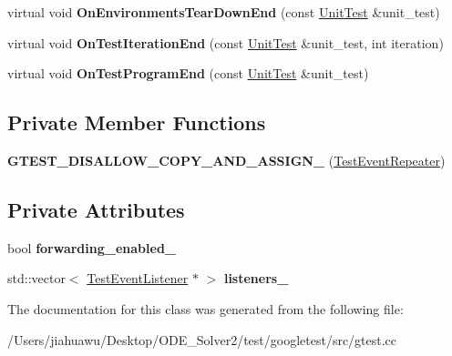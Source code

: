 \begin{DoxyCompactItemize}
\item 
\mbox{\label{classtesting_1_1internal_1_1_test_event_repeater_a8428220c4cf9f0cea2dfd9a70f07ab7f}} 
virtual void {\bfseries On\+Environments\+Tear\+Down\+End} (const \mbox{\hyperlink{classtesting_1_1_unit_test}{Unit\+Test}} \&unit\+\_\+test)
\item 
\mbox{\label{classtesting_1_1internal_1_1_test_event_repeater_a94253e3c11753328e8a031f39352708f}} 
virtual void {\bfseries On\+Test\+Iteration\+End} (const \mbox{\hyperlink{classtesting_1_1_unit_test}{Unit\+Test}} \&unit\+\_\+test, int iteration)
\item 
\mbox{\label{classtesting_1_1internal_1_1_test_event_repeater_a4622616259747dbcc23f5ee39ef99ec0}} 
virtual void {\bfseries On\+Test\+Program\+End} (const \mbox{\hyperlink{classtesting_1_1_unit_test}{Unit\+Test}} \&unit\+\_\+test)
\end{DoxyCompactItemize}
\subsection*{Private Member Functions}
\begin{DoxyCompactItemize}
\item 
\mbox{\label{classtesting_1_1internal_1_1_test_event_repeater_a882648737e85eff0986ff66b794e310a}} 
{\bfseries G\+T\+E\+S\+T\+\_\+\+D\+I\+S\+A\+L\+L\+O\+W\+\_\+\+C\+O\+P\+Y\+\_\+\+A\+N\+D\+\_\+\+A\+S\+S\+I\+G\+N\+\_\+} (\mbox{\hyperlink{classtesting_1_1internal_1_1_test_event_repeater}{Test\+Event\+Repeater}})
\end{DoxyCompactItemize}
\subsection*{Private Attributes}
\begin{DoxyCompactItemize}
\item 
\mbox{\label{classtesting_1_1internal_1_1_test_event_repeater_a1f7e494642d653eaad800504510d18a3}} 
bool {\bfseries forwarding\+\_\+enabled\+\_\+}
\item 
\mbox{\label{classtesting_1_1internal_1_1_test_event_repeater_a1c08e9302639108588d764b671c54825}} 
std\+::vector$<$ \mbox{\hyperlink{classtesting_1_1_test_event_listener}{Test\+Event\+Listener}} $\ast$ $>$ {\bfseries listeners\+\_\+}
\end{DoxyCompactItemize}


The documentation for this class was generated from the following file\+:\begin{DoxyCompactItemize}
\item 
/\+Users/jiahuawu/\+Desktop/\+O\+D\+E\+\_\+\+Solver2/test/googletest/src/gtest.\+cc\end{DoxyCompactItemize}
